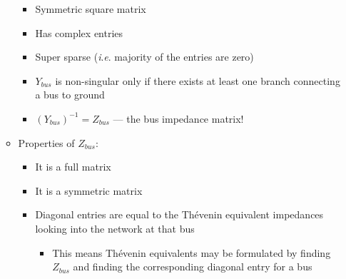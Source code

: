 \begin{itemize}
\begin{itemize}
\begin{itemize}
          \item Symmetric square matrix

          \item Has complex entries

          \item Super sparse (\textit{i}.\textit{e}. majority of the entries are zero)

          \item $Y_{bus}$ is non-singular only if there exists at least one branch connecting a bus to ground

          \item $(Y_{bus})^{-1}=Z_{bus}$ — the bus impedance matrix!

        \end{itemize}

      \item Properties of $Z_{bus}$:

        \begin{itemize}

          \item It is a full matrix

          \item It is a symmetric matrix

          \item Diagonal entries are equal to the Th\'evenin equivalent impedances looking into the network at that bus

            \begin{itemize}

              \item This means Th\'evenin equivalents may be formulated by finding $Z_{bus}$ and finding the corresponding diagonal entry for a bus

            \end{itemize}

        \end{itemize}

    \end{itemize}

\end{itemize}



